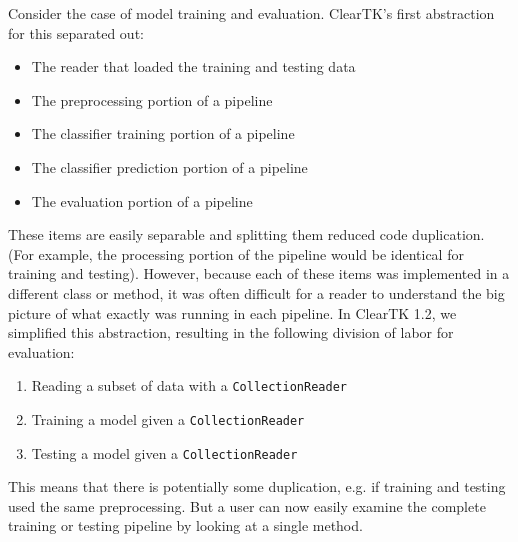\documentclass[10pt, a4paper]{article}
\newcommand{\code}[1]{\texttt{\small #1}}
\begin{document}
Consider the case of model training and evaluation.
ClearTK's first abstraction for this separated out:
\begin{itemize}
\item The reader that loaded the training and testing data
\item The preprocessing portion of a pipeline
\item The classifier training portion of a pipeline
\item The classifier prediction portion of a pipeline
\item The evaluation portion of a pipeline
\end{itemize}
These items are easily separable and splitting them reduced code duplication. (For example, the processing portion of the pipeline would be identical for training and testing).
However, because each of these items was implemented in a different class or method, it was often difficult for a reader to understand the big picture of what exactly was running in each pipeline.
In ClearTK 1.2, we simplified this abstraction, resulting in the following division of labor for evaluation:
\begin{enumerate}
\item Reading a subset of data with a \code{CollectionReader}
\item Training a model given a \code{CollectionReader}
\item Testing a model given a \code{CollectionReader}
\end{enumerate}
This means that there is potentially some duplication, e.g. if training and testing used the same preprocessing.
But a user can now easily examine the complete training or testing pipeline by looking at a single method.
\end{document}
